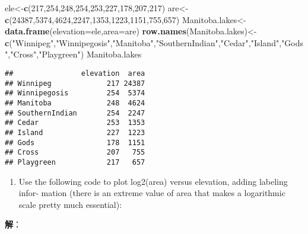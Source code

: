 \documentclass[
]{article}
\newenvironment{Shaded}{\begin{snugshade}}{\end{snugshade}}
\newcommand{\DataTypeTok}[1]{\textcolor[rgb]{0.13,0.29,0.53}{#1}}
\newcommand{\DecValTok}[1]{\textcolor[rgb]{0.00,0.00,0.81}{#1}}
\newcommand{\KeywordTok}[1]{\textcolor[rgb]{0.13,0.29,0.53}{\textbf{#1}}}
\newcommand{\NormalTok}[1]{#1}
\newcommand{\StringTok}[1]{\textcolor[rgb]{0.31,0.60,0.02}{#1}}
\providecommand{\tightlist}{%
  \setlength{\itemsep}{0pt}\setlength{\parskip}{0pt}}
\begin{document}
\begin{Shaded}
\begin{Highlighting}[]
\NormalTok{ele<-}\KeywordTok{c}\NormalTok{(}\DecValTok{217}\NormalTok{,}\DecValTok{254}\NormalTok{,}\DecValTok{248}\NormalTok{,}\DecValTok{254}\NormalTok{,}\DecValTok{253}\NormalTok{,}\DecValTok{227}\NormalTok{,}\DecValTok{178}\NormalTok{,}\DecValTok{207}\NormalTok{,}\DecValTok{217}\NormalTok{)}
\NormalTok{are<-}\KeywordTok{c}\NormalTok{(}\DecValTok{24387}\NormalTok{,}\DecValTok{5374}\NormalTok{,}\DecValTok{4624}\NormalTok{,}\DecValTok{2247}\NormalTok{,}\DecValTok{1353}\NormalTok{,}\DecValTok{1223}\NormalTok{,}\DecValTok{1151}\NormalTok{,}\DecValTok{755}\NormalTok{,}\DecValTok{657}\NormalTok{)}
\NormalTok{Manitoba.lakes<-}\KeywordTok{data.frame}\NormalTok{(}\DataTypeTok{elevation=}\NormalTok{ele,}\DataTypeTok{area=}\NormalTok{are)}
\KeywordTok{row.names}\NormalTok{(Manitoba.lakes)<-}\KeywordTok{c}\NormalTok{(}\StringTok{"Winnipeg"}\NormalTok{,}\StringTok{"Winnipegosis"}\NormalTok{,}\StringTok{"Manitoba"}\NormalTok{,}\StringTok{"SouthernIndian"}\NormalTok{,}\StringTok{"Cedar"}\NormalTok{,}\StringTok{"Island"}\NormalTok{,}\StringTok{"Gods"}\NormalTok{,}\StringTok{"Cross"}\NormalTok{,}\StringTok{"Playgreen"}\NormalTok{)}
\NormalTok{Manitoba.lakes}
\end{Highlighting}
\end{Shaded}

\begin{verbatim}
##                elevation  area
## Winnipeg             217 24387
## Winnipegosis         254  5374
## Manitoba             248  4624
## SouthernIndian       254  2247
## Cedar                253  1353
## Island               227  1223
## Gods                 178  1151
## Cross                207   755
## Playgreen            217   657
\end{verbatim}

\begin{enumerate}
\def\labelenumi{(\alph{enumi})}
\tightlist
\item
  Use the following code to plot log2(area) versus elevation, adding
  labeling infor- mation (there is an extreme value of area that makes a
  logarithmic scale pretty much essential):
\end{enumerate}

\textbf{解}：
\end{document}

